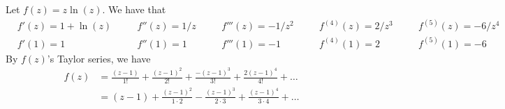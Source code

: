 \documentclass{article}
\theoremstyle{definition}
\begin{document}
    \begin{prob}{6.114} $ $ \vspace{2mm} \\
    	Let $f(z) = z\ln(z)$. We have that 
			\begin{alignat*}{5}
				&f'(z) = 1+ \ln(z) \quad &&f''(z) = 1/z \quad &&f'''(z) = -1/z^2 \quad &&f^{(4)}(z) = 2/z^3 \quad &&f^{(5)}(z) = -6/z^4 \\
				&f'(1) = 1 &&f''(1) = 1 &&f'''(1) = -1 &&f^{(4)}(1) = 2 &&f^{(5)}(1) = -6
			\end{alignat*}
		By $f(z)$'s Taylor series, we have
			\begin{align*}
				f(z) &= \frac{(z-1)}{1!} + \frac{(z-1)^2}{2!} + \frac{-(z-1)^3}{3!} + \frac{2(z-1)^4}{4!} + \dots \\
					 &= (z-1) + \frac{(z-1)^2}{1 \cdot 2} - \frac{(z-1)^3}{2 \cdot 3} + \frac{(z-1)^4}{3 \cdot 4} + \dots
			\end{align*}
    \end{prob}
\end{document}
